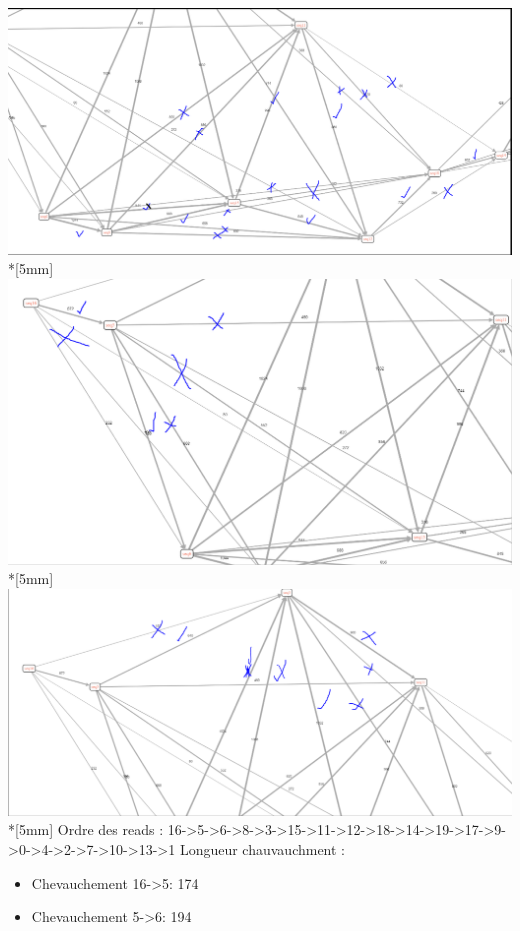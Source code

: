 \documentclass[11pt, letterpaper]{article}
\begin{document}
{\newpage
\includegraphics[width=\textwidth]{Images/Reduction_trans_3.png} \\*[5mm]
\includegraphics[width=\textwidth]{Images/Reduction_trans_4.png} \\*[5mm]
\newpage
\includegraphics[width=\textwidth]{Images/Reduction_trans_5.png} \\*[5mm]
Ordre des reads : 16->5->6->8->3->15->11->12->18->14->19->17->9->0->4->2->7->10->13->1
Longueur chauvauchment : 
\begin{itemize}
\item Chevauchement 16->5: 174
\item Chevauchement 5->6: 194

\end{itemize}}
\end{document}
